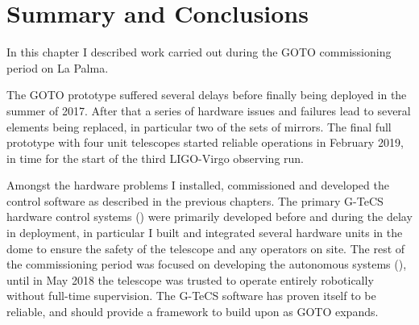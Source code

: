 
\section{Summary and Conclusions}
\label{sec:commissioning_conclusion}


\begin{colsection}

In this chapter I described work carried out during the GOTO commissioning period on La Palma.

The GOTO prototype suffered several delays before finally being deployed in the summer of 2017. After that a series of hardware issues and failures lead to several elements being replaced, in particular two of the sets of mirrors. The final full prototype with four unit telescopes started reliable operations in February 2019, in time for the start of the third LIGO-Virgo observing run.

Amongst the hardware problems I installed, commissioned and developed the control software as described in the previous chapters. The primary G-TeCS hardware control systems () were primarily developed before and during the delay in deployment, in particular I built and integrated several hardware units in the dome to ensure the safety of the telescope and any operators on site. The rest of the commissioning period was focused on developing the autonomous systems (), until in May 2018 the telescope was trusted to operate entirely robotically without full-time supervision. The G-TeCS software has proven itself to be reliable, and should provide a framework to build upon as GOTO expands.

\end{colsection}

